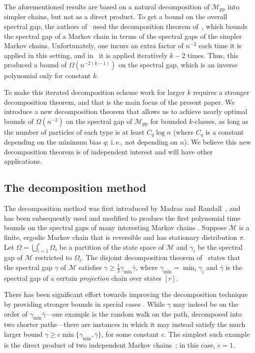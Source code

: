 \documentclass[11pt]{article}
\numberwithin{equation}{section}
\theoremstyle{definition}
\theoremstyle{plain}
\newcommand{\ie}{i.\,e.}
\newcommand{\kPs}{$k$-classes}
\newcommand{\cM}{\mathcal{M}}
\newcommand{\gammahat}{\gamma}
\newcommand{\gammabar}{\bar{\gamma}}
\newcommand{\numrests}{r}
\newcommand{\rhat}{\numrests}
\newcommand{\Omegahat}{\Omega}
\newcommand{\m}{\cM}
\newcommand{\gmin}{\gminhat}
\newcommand{\gminhat}{\gammahat_{\min}}
\newcommand{\mk}{\cM_{\text{pp}}}
\begin{document}
The aforementioned results are based on a natural decomposition of 
$\mk$ into simpler chains, but not as a direct product. To get a bound 
on the overall spectral gap, the authors of~\cite{MS} used the 
decomposition theorem of~\cite{MR00}, which bounds the spectral gap of 
a Markov chain in terms of the spectral gaps of the simpler Markov 
chains. Unfortunately, one incurs an extra factor of $n^{-2}$ each time 
it is applied in this setting, and in~\cite{MS} it is applied 
iteratively $k-2$ times. Thus, this produced a bound
%
of $\Omega(n^{-2(k-1)})$ on the spectral gap,
which is an inverse polynomial only for constant $k$.

To make this iterated decomposition scheme work for larger $k$ requires 
a stronger decomposition theorem, and that is the main focus of the 
present paper. We introduce a new decomposition theorem that allows us 
to achieve nearly optimal bounds of $\Omega(n^{-2})$ on the spectral 
gap of $\mk$ for bounded \kPs, as long as the number of particles of 
each type is at least $C_q\log n$ (where $C_q$ is a constant depending 
on the minimum bias $q$; \ie,  not depending on $n$).  We believe this 
new decomposition theorem is of independent interest and will have 
other applications.  

\subsection{The decomposition method}

The decomposition method was first introduced by Madras and 
Randall~\cite{madr}, and has been subsequently used and modified to 
produce the first polynomial time bounds on the spectral gaps of many 
interesting Markov chains \cite{CDF00,Dest03,Ding2010, EMT18, 
GHS08,HW16, jstv04,mh15,MR00,mrs,PS17, R01}. Suppose $\m$ is a finite, 
ergodic Markov chain that is reversible and has stationary 
distribution $\pi$. Let
%
$\Omega=\bigcup_{i=1}^{\rhat}\Omegahat_i$  %
be a partition of the state space of $\m$ and $\gammahat_i$ 
be the spectral gap of $\m$ restricted to $\Omegahat_i$. The disjoint 
decomposition theorem of~\cite{MR00} states that the spectral gap 
$\gamma$ of $\m$ satisfies $\gamma \geq \frac{1}{2}\gmin\gammabar$, 
where $\gmin=\min_i \gammahat_i$ and $\gammabar$ is the spectral gap of 
a certain \emph{projection} chain over states $[r]$. 

There has been significant effort towards improving the decomposition 
technique by providing stronger bounds in special 
cases \cite{Dest03,EMT18,GHS08,jstv04,mh15,MR00,PS17,R01}. While 
$\gamma$ may indeed be on the order of $\gmin\gammabar$---one example 
is the random walk on the path, decomposed into two
%
shorter  %
paths---there are instances in which it may instead satisfy the much 
larger bound $\gamma \geq c \min\{\gmin, \gammabar\}$, for some 
constant $c$. The simplest such example is the direct product of two 
independent Markov chains~\cite{bmrs,EMT18}; in this case, $c=1$. 
\end{document}
